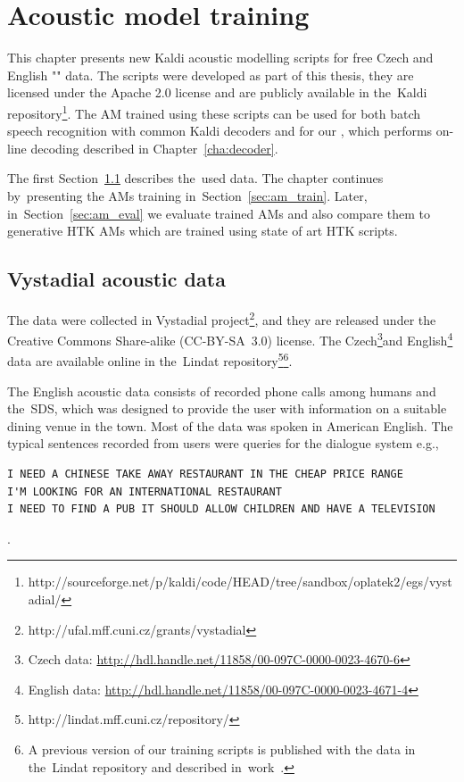 \chapter{Acoustic model training}
\label{cha:train}

This chapter presents new Kaldi acoustic modelling scripts for free Czech and English "" data.
The scripts were developed as part of this thesis, they are licensed under the Apache 2.0 license and are publicly available in the~Kaldi repository\footnote{http://sourceforge.net/p/kaldi/code/HEAD/tree/sandbox/oplatek2/egs/vystadial/}.
The \acf{AM} trained using these scripts can be used for both batch speech recognition with common Kaldi decoders and for our , which performs on-line decoding described in Chapter~\ref{cha:decoder}.

The first Section~\ref{sec:data} describes the~used data. 
The chapter continues by~presenting the \acp{AM} training in~Section~\ref{sec:am_train}. 
Later, in~Section~\ref{sec:am_eval} we evaluate trained \acp{AM} and also compare them to generative \ac{HTK} \acp{AM} which are trained using state of art \ac{HTK} scripts.

\section{Vystadial acoustic data}
\label{sec:data}

The data were collected in Vystadial project\footnote{http://ufal.mff.cuni.cz/grants/vystadial}, and they are released under the Creative Commons Share-alike (CC-BY-SA~3.0) license. 
The Czech\footnote{Czech data: \url{http://hdl.handle.net/11858/00-097C-0000-0023-4670-6}}and English\footnote{English data: \url{http://hdl.handle.net/11858/00-097C-0000-0023-4671-4}} data are available online in the~Lindat repository\footnote{{http://lindat.mff.cuni.cz/repository/}}\footnote{A previous version of our training scripts is published with the data in the~Lindat repository and described in~work~\cite{korvas_2014}.}.

The English acoustic data consists of recorded phone calls among humans and the~\acl{SDS}, which was designed to provide the user with information on a suitable dining venue in the town.
Most of the data was spoken in American English.
The typical sentences recorded from users were queries for the dialogue system e.g.,
\begin{verbatim}
I NEED A CHINESE TAKE AWAY RESTAURANT IN THE CHEAP PRICE RANGE
I'M LOOKING FOR AN INTERNATIONAL RESTAURANT
I NEED TO FIND A PUB IT SHOULD ALLOW CHILDREN AND HAVE A TELEVISION
\end{verbatim}.

